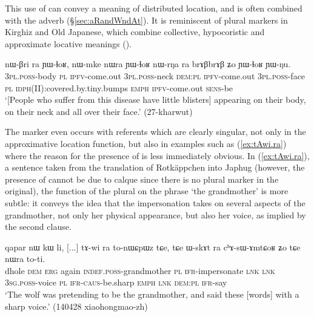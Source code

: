 This use of  can convey a meaning of distributed location, and is often combined with the adverb  (§\ref{sec:aRandWndAt}). It is reminiscent of plural markers in Kirghiz and Old Japanese, which combine collective, hypocoristic and approximate locative meanings (\citealt[195]{antonov07ra}).


\begin{exe}
\ex \label{ex:nWrNa.ra}
\gll nɯ-βri ra ɲɯ-ɬoʁ, nɯ-mke nɯra ɲɯ-ɬoʁ nɯ-rŋa ra brɤβbrɤβ ʑo ɲɯ-ɬoʁ ɲɯ-ŋu. \\
\textsc{3pl}.\textsc{poss}-body \textsc{pl} \textsc{ipfv}-come.out \textsc{3pl}.\textsc{poss}-neck \textsc{dem}:\textsc{pl} \textsc{ipfv}-come.out \textsc{3pl}.\textsc{poss}-face \textsc{pl} \textsc{idph}(II):covered.by.tiny.bumps \textsc{emph} \textsc{ipfv}-come.out  \textsc{sens}-be \\
\glt `[People who suffer from this disease have little blisters] appearing on their body, on their neck and all over their face.' (27-kharwut)
\end{exe} 

The marker  even occurs with referents which are clearly singular, not only in the approximative location function, but also in examples such as (\ref{ex:tAwi.ra}) where the reason for the presence of  is less immediately obvious. In (\ref{ex:tAwi.ra}), a sentence taken from the translation of Rotkäppchen into Japhug (however, the presence of  cannot be due to calque since there is no plural marker in the original), the function of the plural on the phrase  `the grandmother' is more subtle: it conveys the idea that the impersonation takes on several aspects of the grandmother, not only her physical appearance, but also her voice, as implied by the second clause. 

\begin{exe}
\ex \label{ex:tAwi.ra}
\gll  qapar nɯ kɯ li, [...] tɤ-wi ra to-nɯɕpɯz tɕe, tɕe ɯ-skɤt ra cʰɤ-sɯ-ɤmtɕoʁ ʑo tɕe nɯra to-ti. \\
dhole \textsc{dem} \textsc{erg} again { } \textsc{indef}.\textsc{poss}-grandmother \textsc{pl} \textsc{ifr}-impersonate \textsc{lnk} \textsc{lnk} \textsc{3sg}.\textsc{poss}-voice \textsc{pl} \textsc{ifr}-\textsc{caus}-be.sharp \textsc{emph} \textsc{lnk} \textsc{dem}:\textsc{pl} \textsc{ifr}-say \\
\glt `The wolf was pretending to be the grandmother, and said these [words] with a sharp voice.' (140428 xiaohongmao-zh) 
\end{exe} 

